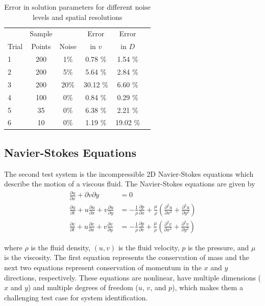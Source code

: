 \documentclass{article}
\begin{document}
\begin{table}[t]
\caption{Error in solution parameters for different noise levels and spatial resolutions}
\label{tab:advdifresults}
\vskip 0.15in
\begin{center}
\begin{small}
\begin{sc}
\begin{tabular}{lccccr}
\toprule
 & Sample &  & Error & Error\\
Trial & Points & Noise & in $v$ & in $D$\\
\midrule
1 & 200 & 1\%  & 0.78 \% & 1.54 \% \\
2 & 200 & 5\%  & 5.64 \% & 2.84 \% \\
3 & 200 & 20\%  & 30.12 \% & 6.60 \% \\
4 & 100 & 0\%  & 0.84 \% & 0.29 \% \\
5 & 35 & 0\%  & 6.38 \% & 2.21 \% \\
6 & 10 & 0\%  & 1.19 \% & 19.02 \% \\
\bottomrule
\end{tabular}
\end{sc}
\end{small}
\end{center}
\vskip -0.1in
\end{table}


\subsection{Navier-Stokes Equations}
The second test system is the incompressible 2D Navier-Stokes equations which describe the motion of a viscous fluid. The Navier-Stokes equations are given by
\begin{align}
  \frac{\partial u}{\partial x} + \partial{v}{\partial y} &= 0 \\
  \frac{\partial u }{\partial t} + u \frac{\partial u }{\partial x} + v \frac{\partial u }{\partial y} &= - \frac{1}{\rho} \frac{\partial p}{\partial x} + \frac{\mu}{\rho}\left( \frac{\partial^2 u}{\partial x^2} + \frac{\partial^2 u}{\partial y^2} \right) \\
\frac{\partial v }{\partial t} + u \frac{\partial v }{\partial x} + v \frac{\partial v }{\partial y} &= - \frac{1}{\rho} \frac{\partial p}{\partial v} + \frac{\mu}{\rho}\left( \frac{\partial^2 v}{\partial x^2} + \frac{\partial^2 v}{\partial y^2} \right)
\end{align}

where $\rho$ is the fluid density, $(u, v)$ is the fluid velocity, $p$ is the pressure, and $\mu$ is the viscosity. The first equation represents the conservation of mass and the next two equations represent conservation of momentum in the $x$ and $y$ directions, respectively. These equations are nonlinear, have multiple dimensions ($x$ and $y$) and multiple degrees of freedom ($u$, $v$, and $p$), which makes them a challenging test case for system identification.
\end{document}
